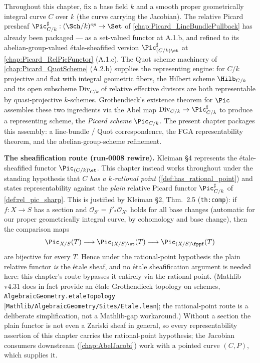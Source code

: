 Throughout this chapter, fix a base field \(k\) and a smooth proper geometrically
integral curve \(C\) over \(k\) (the curve carrying the Jacobian). The relative
Picard presheaf \(\Pic^\sharp_{C/k} : (\Sch/k)^{op} \to \Set\) of
\cref{chap:Picard_LineBundlePullback} has already been packaged --- as a
set-valued functor at A.1.b, and refined to its abelian-group-valued
\'etale-sheafified version \(\Pic^\sharp_{(C/k)\et}\) at
\cref{chap:Picard_RelPicFunctor} (A.1.c). The Quot scheme machinery of
\cref{chap:Picard_QuotScheme} (A.2.b) supplies the representing engine: for
\(C/k\) projective and flat with integral geometric fibers, the Hilbert scheme
\(\Hilb_{C/k}\) and its open subscheme \(\mathrm{Div}_{C/k}\) of relative effective
divisors are both representable by quasi-projective \(k\)-schemes. Grothendieck's
existence theorem for \(\Pic\) assembles these two ingredients via the Abel
map \(\mathrm{Div}_{C/k} \to \Pic^\sharp_{C/k}\) to produce a representing scheme,
the \emph{Picard scheme} \(\Pic_{C/k}\). The present chapter packages this
assembly: a line-bundle / Quot correspondence, the FGA representability
theorem, and the abelian-group-scheme refinement.

\medskip

\textbf{The sheafification route (run-0008 rewire).} Kleiman \S 4 represents
the \'etale-sheafified functor \(\Pic_{(C/k)\et}\). This chapter instead
works throughout under the standing hypothesis that \emph{\(C\) has a
\(k\)-rational point} (\cref{def:has_rational_point}) and states
representability against the \emph{plain} relative Picard functor
\(\Pic^\sharp_{C/k}\) of \cref{def:rel_pic_sharp}. This is justified by
Kleiman \S 2, Thm.~2.5 (\texttt{th:comp}): if \(f : X \to S\) has a section
and \(\mathcal O_{S'} = f'_* \mathcal O_{X'}\) holds for all base changes
(automatic for our proper geometrically integral curve, by cohomology and
base change), then the comparison maps
\[
  \Pic_{X/S}(T) \longrightarrow \Pic_{(X/S)\et}(T) \longrightarrow
  \Pic_{(X/S)\fppf}(T)
\]
are bijective for every \(T\). Hence under the rational-point hypothesis the
plain relative functor \emph{is} the \'etale sheaf, and no \'etale
sheafification argument is needed here: this chapter's route bypasses it
entirely via the rational point. (Mathlib v4.31 does in fact provide an
\'etale Grothendieck topology on schemes,
\texttt{AlgebraicGeometry.etaleTopology}
[\texttt{Mathlib/AlgebraicGeometry/Sites/Etale.lean}]; the rational-point
route is a deliberate simplification, not a Mathlib-gap workaround.)
Without a section the plain functor is not even a Zariski sheaf in
general, so every representability assertion of this chapter carries the
rational-point hypothesis; the Jacobian consumers downstream
(\cref{chap:AbelJacobi}) work with a pointed curve \((C, P)\), which
supplies it.

